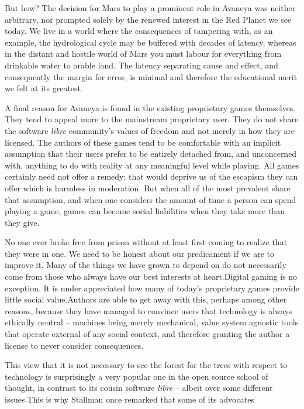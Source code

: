 But how? The decision for Mars to play a prominent role in Avaneya was neither arbitrary, nor prompted solely by the renewed interest in the Red Planet we see today. We live in a world where the consequences of tampering with, as an example, the hydrological cycle may be buffered with decades of latency, whereas in the distant and hostile world of Mars you must labour for everything from drinkable water to arable land. The latency separating cause and effect, and consequently the margin for error, is minimal and therefore the educational merit we felt at its greatest.

A final reason for Avaneya is found in the existing proprietary games themselves. They tend to appeal more to the mainstream proprietary user. They do not share the software {\it libre} community's values of freedom and not merely in how they are licensed. The authors of these games tend to be comfortable with an implicit assumption that their users prefer to be entirely detached from, and unconcerned with, anything to do with reality at any meaningful level while playing. All games certainly need not offer a remedy; that would deprive us of the escapism they can offer which is harmless in moderation. But when all of the most prevalent share that assumption, and when one considers the amount of time a person can spend playing a game, games can become social liabilities when they take more than they give.

No one ever broke free from prison without at least first coming to realize that they were in one. We need to be honest about our predicament if we are to improve it. Many of the things we have grown to depend on do not necessarily come from those who always have our best interests at heart.\footnotecite[santoso2008] Digital gaming is no exception. It is under appreciated how many of today's proprietary games provide little social value. Authors are able to get away with this, perhaps among other reasons, because they have managed to convince users that technology is always ethically neutral -- machines being merely mechanical, value system agnostic tools that operate external of any social context, and therefore granting the author a license to never consider consequences.

This view that it is not necessary to see the forest for the trees with respect to technology is surprisingly a very popular one in the open source school of thought, in contrast to its cousin software {\it libre} -- albeit over some different issues. This is why Stallman once remarked that some of its advocates \footnotecite[auza2008] 

